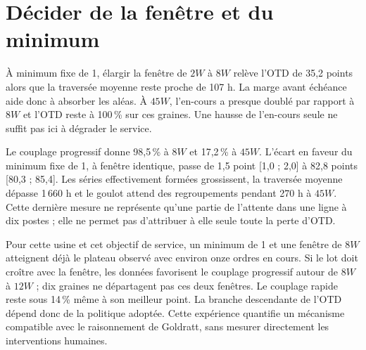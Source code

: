 \section*{Décider de la fenêtre et du minimum}
À minimum fixe de 1, élargir la fenêtre de $2W$ à $8W$ relève l'OTD de
35,2 points alors que la traversée moyenne reste proche de 107 h. La marge
avant échéance aide donc à absorber les aléas. À $45W$, l'en-cours a presque
doublé par rapport à $8W$ et l'OTD reste à 100\,\% sur ces graines. Une hausse
de l'en-cours seule ne suffit pas ici à dégrader le service.

Le couplage progressif donne 98,5\,\% à $8W$ et 17,2\,\% à $45W$.
L'écart en faveur du minimum fixe de 1, à fenêtre identique, passe de
1,5 point [1,0 ; 2,0] à 82,8 points [80,3 ; 85,4]. Les séries effectivement
formées grossissent, la traversée moyenne dépasse 1\,660 h et le goulot attend
des regroupements pendant 270 h à $45W$. Cette dernière mesure ne représente
qu'une partie de l'attente dans une ligne à dix postes ; elle ne permet pas
d'attribuer à elle seule toute la perte d'OTD.

Pour cette usine et cet objectif de service, un minimum de 1 et une fenêtre
de $8W$ atteignent déjà le plateau observé avec environ onze ordres en cours.
Si le lot doit croître avec la fenêtre, les données favorisent le couplage
progressif autour de $8W$ à $12W$ ; dix graines ne départagent pas ces deux
fenêtres. Le couplage rapide reste sous 14\,\% même à son meilleur point.
La branche descendante de l'OTD dépend donc de la politique adoptée. Cette
expérience quantifie un mécanisme compatible avec le raisonnement de Goldratt,
sans mesurer directement les interventions humaines.
